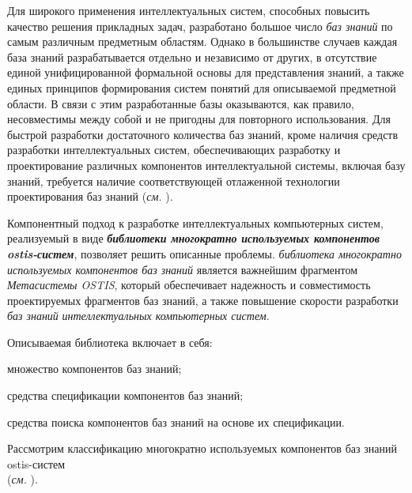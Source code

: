 Для широкого применения интеллектуальных систем, способных повысить качество решения
прикладных задач, разработано большое число \textit{баз знаний} по самым различным предметным областям. Однако в большинстве случаев каждая база знаний разрабатывается отдельно и независимо от других, в отсутствие единой унифицированной формальной основы для представления знаний, а также единых принципов формирования систем понятий для описываемой предметной области. В связи с этим разработанные базы оказываются, как правило, несовместимы между собой и не пригодны для повторного использования. Для быстрой разработки достаточного количества баз знаний, кроме наличия средств разработки интеллектуальных систем, обеспечивающих разработку и проектирование различных компонентов интеллектуальной системы, включая базу знаний, требуется наличие соответствующей отлаженной технологии проектирования баз знаний (\textit{см. }). 

Компонентный подход к разработке интеллектуальных компьютерных систем, реализуемый в виде \textbf{\textit{библиотеки многократно используемых компонентов ostis-систем}}, позволяет решить описанные проблемы. \textit{библиотека многократно используемых компонентов баз знаний} является важнейшим фрагментом \textit{Метасистемы OSTIS}, который обеспечивает надежность и совместимость проектируемых фрагментов баз знаний, а также повышение скорости разработки \textit{баз знаний} \textit{интеллектуальных компьютерных систем}.

Описываемая библиотека включает в себя:
\begin{textitemize}
	\item множество компонентов баз знаний;
	\item средства спецификации компонентов баз знаний;
	\item средства поиска компонентов баз знаний на основе их спецификации.
\end{textitemize}

Рассмотрим классификацию многократно используемых компонентов баз знаний ostis-систем\\ (\textit{см. }).

